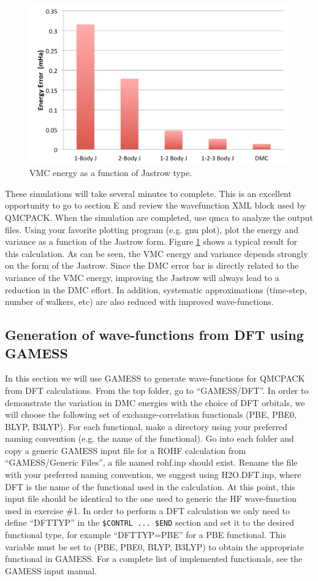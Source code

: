 \begin{figure}
\begin{center}
\includegraphics[trim = 0mm 0mm 0mm 0mm, clip,width=0.75\columnwidth]{./figures/lab_advanced_molecules_vmc_jastrow}
\end{center}
\caption{VMC energy as a function of Jastrow type.
\label{fig:lam_vmc_jastrow}
}
\end{figure}

These simulations will take several minutes to complete. This is an excellent opportunity
to go to section E and review the wavefunction XML block used by QMCPACK. When the
simulation are completed, use qmca to analyze the output files. Using your favorite plotting
program (e.g. gnu plot), plot the energy and variance as a function of the Jastrow form.
Figure \ref{fig:lam_vmc_jastrow} shows a typical result for this calculation. As can be seen, the VMC energy and
variance depends strongly on the form of the Jastrow. Since the DMC error bar is directly
related to the variance of the VMC energy, improving the Jastrow will always lead to a
reduction in the DMC effort. In addition, systematic approximations (time-step, number of
walkers, etc) are also reduced with improved wave-functions.


\subsection{Generation of wave-functions from DFT using GAMESS}
In this section we will use GAMESS to generate wave-functions for QMCPACK from
DFT calculations. From the top folder, go to ``GAMESS/DFT''. In order to demonstrate
the variation in DMC energies with the choice of DFT orbitals, we will choose the following
set of exchange-correlation functionals (PBE, PBE0, BLYP, B3LYP). For each functional,
make a directory using your preferred naming convention (e.g. the name of the functional).
Go into each folder and copy a generic GAMESS input file for a ROHF calculation from
``GAMESS/Generic Files'', a file named rohf.inp should exist. Rename the file with your
preferred naming convention, we suggest using H2O.DFT.inp, where DFT is the name of
the functional used in the calculation. At this point, this input file should be identical to the
one used to generic the HF wave-function used in exercise \#1. In order to perform a DFT
calculation we only need to define ``DFTTYP'' in the \texttt{\$CONTRL ... \$END} section and set
it to the desired functional type, for example ``DFTTYP=PBE'' for a PBE functional. This
variable must be set to (PBE, PBE0, BLYP, B3LYP) to obtain the appropriate functional in
GAMESS. For a complete list of implemented functionals, see the GAMESS input manual.


